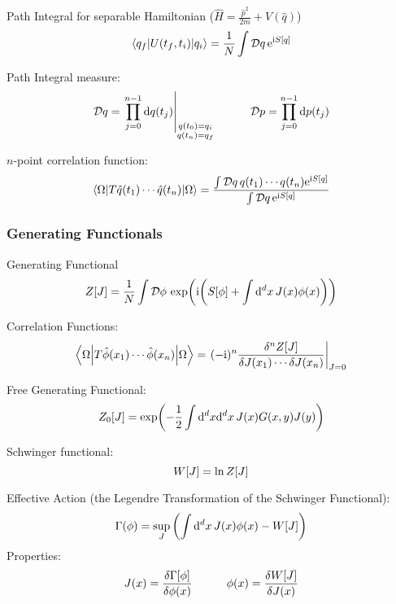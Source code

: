 		\noindent
		Path Integral for separable Hamiltonian (\ie $\hat{H} = \frac{\hat{p}^2}{2m} + V(\hat{q})$)
		\begin{equation}
			\mel**{q_f}{U(t_f, t_i)}{q_i} = \frac{1}{N} \int \mathcal{D}q \, \mathrm{e}^{\mathrm{i} S[q]}
		\end{equation}
		
		\noindent
		Path Integral measure:
		\begin{equation}
			\mathcal{D}q = \eval{\prod_{j=0}^{n-1} \dd q(t_j)}_{\substack{q(t_0)=q_i\\q(t_n)=q_f}}
			\hsp
			\mathcal{D}p = \prod_{j=0}^{n-1} \dd p(t_j)
		\end{equation}
		
		\noindent
		$n$-point correlation function:
		\begin{equation}
			\mel**{\Omega}{T\hat{q}(t_1)\dotsb\hat{q}(t_n)}{\Omega} = \frac{\int\mathcal{D}q\,q(t_1)\dotsb q(t_n)\mathrm{e}^{\mathrm{i} S \qty[q]}}{\int\mathcal{D}q\,\mathrm{e}^{\mathrm{i} S\qty[q]}}
		\end{equation}

		\subsubsection{Generating Functionals}
			Generating Functional
			\begin{equation}
				Z[J] = \frac{1}{N} \int \mathcal{D}\phi\, \exp(\mathrm{i}\qty(S[\phi] + \int \dd^d x \, J(x) \phi(x)))
			\end{equation}
			
			\noindent
			Correlation Functions:
			\begin{equation}
				\mel**{\Omega}{T \hat{\phi}(x_1) \dotsb \hat{\phi}(x_n)}{\Omega} = \eval{(-\i)^{n} \frac{\delta^n Z[J]}{\delta J(x_1) \dotsb \delta J(x_n)}}_{J=0}
			\end{equation}

			\noindent
			Free Generating Functional:
			\begin{equation}
				Z_0\qty[J] = \exp(-\frac{1}{2}\int\dd^d x \dd^d x\, J(x) G(x,y)J(y))
			\end{equation}

			\noindent
			Schwinger functional:
			\begin{equation}
				W\qty[J] = \ln Z\qty[J]
			\end{equation}

			\noindent
			Effective Action (\ie the Legendre Transformation of the Schwinger Functional):
			\begin{equation}
				\Gamma(\phi) = \sup_{J} \qty( \int \dd^d x \, J(x) \phi(x) - W[J])
			\end{equation}
			Properties:
			\begin{equation}
				J(x)=\fdv{\Gamma\qty[\phi]}{\phi(x)}
				\hsp \phi(x) = \fdv{W\qty[J]}{J(x)}
			\end{equation}


